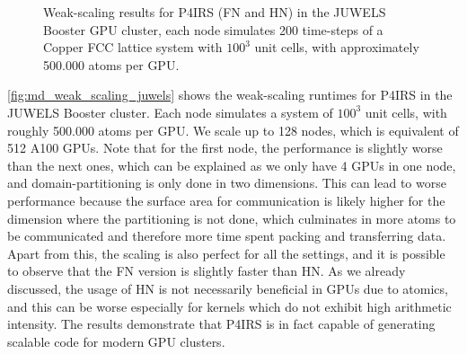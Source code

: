 \documentclass[Afour,sageh,times]{sagej}
\begin{document}
\begin{figure}[t]
\centering
{}
\vspace{-2ex}
\caption{Weak-scaling results for P4IRS (FN and HN) in the JUWELS Booster GPU cluster, each node simulates 200 time-steps of a Copper FCC lattice system with $100^3$ unit cells, with approximately 500.000 atoms per GPU.}
\vspace{-2ex}
\label{fig:md_weak_scaling_juwels}
\end{figure}

\autoref{fig:md_weak_scaling_juwels} shows the weak-scaling runtimes for P4IRS in the JUWELS Booster cluster.
Each node simulates a system of $100^3$ unit cells, with roughly 500.000 atoms per GPU.
We scale up to 128 nodes, which is equivalent of 512 A100 GPUs.
Note that for the first node, the performance is slightly worse than the next ones, which can be explained as we only have 4 GPUs in one node, and domain-partitioning is only done in two dimensions.
This can lead to worse performance because the surface area for communication is likely higher for the dimension where the partitioning is not done, which culminates in more atoms to be communicated and therefore more time spent packing and transferring data.
Apart from this, the scaling is also perfect for all the settings, and it is possible to observe that the \ac{FN} version is slightly faster than \ac{HN}.
As we already discussed, the usage of \ac{HN} is not necessarily beneficial in GPUs due to atomics, and this can be worse especially for kernels which do not exhibit high arithmetic intensity.
The results demonstrate that P4IRS is in fact capable of generating scalable code for modern GPU clusters.
\end{document}
